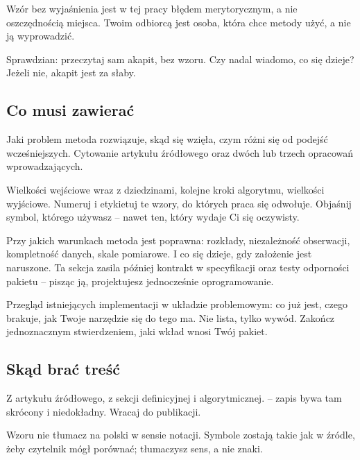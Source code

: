  Wzór bez wyjaśnienia jest w tej pracy błędem merytorycznym, a nie oszczędnością miejsca. Twoim odbiorcą jest osoba, która chce metody użyć, a nie ją wyprowadzić.

Sprawdzian: przeczytaj sam akapit, bez wzoru. Czy nadal wiadomo, co się dzieje? Jeżeli nie, akapit jest za słaby.

\subsection{Co musi zawierać}

 Jaki problem metoda rozwiązuje, skąd się wzięła, czym różni się od podejść wcześniejszych. Cytowanie artykułu źródłowego oraz dwóch lub trzech opracowań wprowadzających.

 Wielkości wejściowe wraz z dziedzinami, kolejne kroki algorytmu, wielkości wyjściowe. Numeruj i etykietuj te wzory, do których praca się odwołuje. Objaśnij  symbol, którego używasz -- nawet ten, który wydaje Ci się oczywisty.

 Przy jakich warunkach metoda jest poprawna: rozkłady, niezależność obserwacji, kompletność danych, skale pomiarowe. I co się dzieje, gdy założenie jest naruszone. Ta sekcja zasila później kontrakt w specyfikacji oraz testy odporności pakietu -- pisząc ją, projektujesz jednocześnie oprogramowanie.

 Przegląd istniejących implementacji w układzie problemowym: co już jest, czego brakuje, jak Twoje narzędzie się do tego ma. Nie lista, tylko wywód. Zakończ jednoznacznym stwierdzeniem, jaki wkład wnosi Twój pakiet.

\subsection{Skąd brać treść}

Z artykułu źródłowego, z sekcji definicyjnej i algorytmicznej.  -- zapis bywa tam skrócony i niedokładny. Wracaj do publikacji.

Wzoru nie tłumacz na polski w sensie notacji. Symbole zostają takie jak w źródle, żeby czytelnik mógł porównać; tłumaczysz sens, a nie znaki.


